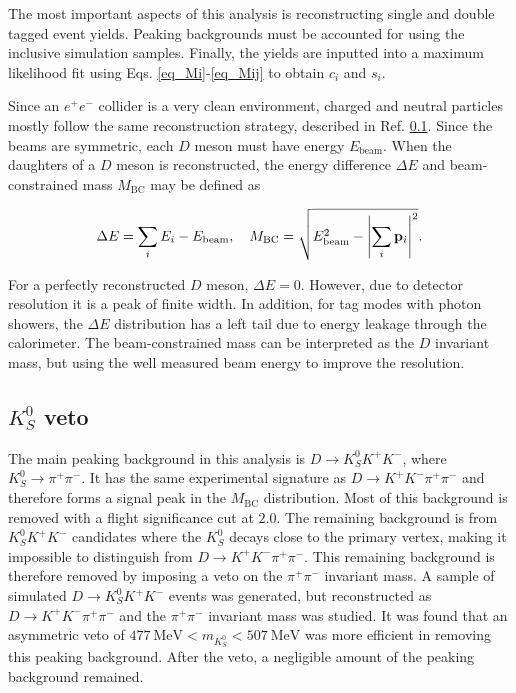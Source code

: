 \documentclass[12pt, a4paper, notitlepage, onecolumn]{article}
\numberwithin{equation}{section}
\begin{document}
The most important aspects of this analysis is reconstructing single and double tagged event yields. Peaking backgrounds must be accounted for using the inclusive simulation samples. Finally, the yields are inputted into a maximum likelihood fit using Eqs. \eqref{eq_Mi}-\eqref{eq_Mij} to obtain $c_i$ and $s_i$.

Since an $e^+e^-$ collider is a very clean environment, charged and neutral particles mostly follow the same reconstruction strategy, described in Ref. \ref{}. Since the beams are symmetric, each $D$ meson must have energy $E_\text{beam}$. When the daughters of a $D$ meson is reconstructed, the energy difference $\Delta E$ and beam-constrained mass $M_\text{BC}$ may be defined as

\begin{equation*}
  \Delta E = \sum_i E_i - E_\text{beam}, \quad M_\text{BC} = \sqrt{E_\text{beam}^2 - \abs{\sum_i\vb{p}_i}^2}.
\end{equation*}

For a perfectly reconstructed $D$ meson, $\Delta E = 0$. However, due to detector resolution it is a peak of finite width. In addition, for tag modes with photon showers, the $\Delta E$ distribution has a left tail due to energy leakage through the calorimeter. The beam-constrained mass can be interpreted as the $D$ invariant mass, but using the well measured beam energy to improve the resolution.

\subsection{\texorpdfstring{$K_S^0$}{KS0} veto}
\noindent The main peaking background in this analysis is $D\to K_S^0K^+K^-$, where $K_S^0\to\pi^+\pi^-$. It has the same experimental signature as $D\to K^+K^-\pi^+\pi^-$ and therefore forms a signal peak in the $M_\text{BC}$ distribution. Most of this background is removed with a flight significance cut at $2.0$. The remaining background is from $K_S^0K^+K^-$ candidates where the $K_S^0$ decays close to the primary vertex, making it impossible to distinguish from $D\to K^+K^-\pi^+\pi^-$. This remaining background is therefore removed by imposing a veto on the $\pi^+\pi^-$ invariant mass. A sample of simulated $D\to K_S^0K^+K^-$ events was generated, but reconstructed as $D\to K^+K^-\pi^+\pi^-$ and the $\pi^+\pi^-$ invariant mass was studied. It was found that an asymmetric veto of $\SI{477}{\mega\eV} < m_{K_S^0} < \SI{507}{\mega\eV}$ was more efficient in removing this peaking background. After the veto, a negligible amount of the peaking background remained.
\end{document}
